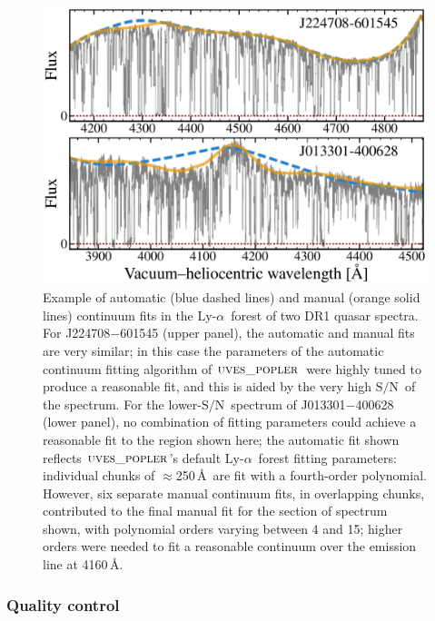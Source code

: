\documentclass[fleqn,usenatbib,usedcolumn]{mnras}
\newcommand{\SN}{\ensuremath{\textrm{S/N}}}
\newcommand{\lya}{\ensuremath{\textrm{Ly-}\alpha}}
\newcommand{\popler}{\ensuremath{\textsc{uves\_popler}}}
\begin{document}
\begin{figure}
\begin{center}
\includegraphics[width=0.90\columnwidth]{DR1_Lya_cont.pdf}
\vspace{-1em}
\caption{Example of automatic (blue dashed lines) and manual (orange solid lines) continuum fits in the \lya\ forest of two DR1 quasar spectra. For J224708$-$601545 (upper panel), the automatic and manual fits are very similar; in this case the parameters of the automatic continuum fitting algorithm of \popler\ were highly tuned to produce a reasonable fit, and this is aided by the very high \SN\ of the spectrum. For the lower-\SN\ spectrum of J013301$-$400628 (lower panel), no combination of fitting parameters could achieve a reasonable fit to the region shown here; the automatic fit shown reflects \popler's default \lya\ forest fitting parameters: individual chunks of $\approx$250\,\AA\ are fit with a fourth-order polynomial. However, six separate manual continuum fits, in overlapping chunks, contributed to the final manual fit for the section of spectrum shown, with polynomial orders varying between 4 and 15; higher orders were needed to fit a reasonable continuum over the emission line at 4160\,\AA.}
\label{f:Lyacont}
\end{center}
\end{figure}

\subsubsection{Quality control}\label{sss:quality}
\end{document}
